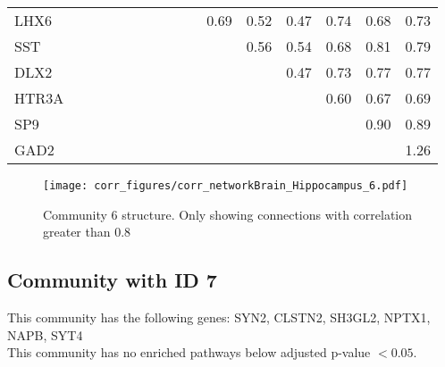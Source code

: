 \begin{longtable}{lrrrrrrrrrrrrrrr}
LHX6  &            &             &            &           &            &            &            &            &            &      0.69 &       0.52 &        0.47 &      0.74 &       0.68 &          0.73 \\
SST   &            &             &            &           &            &            &            &            &            &           &       0.56 &        0.54 &      0.68 &       0.81 &          0.79 \\
DLX2  &            &             &            &           &            &            &            &            &            &           &            &        0.47 &      0.73 &       0.77 &          0.77 \\
HTR3A &            &             &            &           &            &            &            &            &            &           &            &             &      0.60 &       0.67 &          0.69 \\
SP9   &            &             &            &           &            &            &            &            &            &           &            &             &           &       0.90 &          0.89 \\
GAD2  &            &             &            &           &            &            &            &            &            &           &            &             &           &            &          1.26 \\
\end{longtable}


\begin{figure}[h!]
\centering
\texttt{[image: corr\_figures/corr\_networkBrain\_Hippocampus\_6.pdf]}
\caption{Community 6 structure. Only showing connections with correlation greater than 0.8}
\end{figure}




\subsection*{Community with ID 7}
This community has the following genes: SYN2, CLSTN2, SH3GL2, NPTX1, NAPB, SYT4
\\
This community has no enriched pathways below adjusted p-value $< 0.05$.

